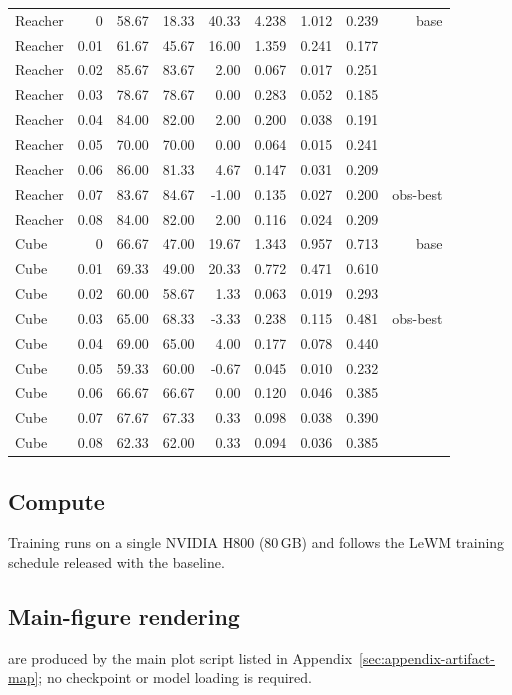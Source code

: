 \documentclass[10pt]{article}
\begin{document}
\begin{landscape}
\begin{table}[p]
\begin{tabular}{lrrrrrrrr}
\midrule
Reacher & 0 & 58.67 & 18.33 & 40.33 & 4.238 & 1.012 & 0.239 & base \\
Reacher & 0.01 & 61.67 & 45.67 & 16.00 & 1.359 & 0.241 & 0.177 &  \\
Reacher & 0.02 & 85.67 & 83.67 & 2.00 & 0.067 & 0.017 & 0.251 &  \\
Reacher & 0.03 & 78.67 & 78.67 & 0.00 & 0.283 & 0.052 & 0.185 &  \\
Reacher & 0.04 & 84.00 & 82.00 & 2.00 & 0.200 & 0.038 & 0.191 &  \\
Reacher & 0.05 & 70.00 & 70.00 & 0.00 & 0.064 & 0.015 & 0.241 &  \\
Reacher & 0.06 & 86.00 & 81.33 & 4.67 & 0.147 & 0.031 & 0.209 &  \\
Reacher & 0.07 & 83.67 & 84.67 & -1.00 & 0.135 & 0.027 & 0.200 & obs-best \\
Reacher & 0.08 & 84.00 & 82.00 & 2.00 & 0.116 & 0.024 & 0.209 &  \\
\midrule
Cube & 0 & 66.67 & 47.00 & 19.67 & 1.343 & 0.957 & 0.713 & base \\
Cube & 0.01 & 69.33 & 49.00 & 20.33 & 0.772 & 0.471 & 0.610 &  \\
Cube & 0.02 & 60.00 & 58.67 & 1.33 & 0.063 & 0.019 & 0.293 &  \\
Cube & 0.03 & 65.00 & 68.33 & -3.33 & 0.238 & 0.115 & 0.481 & obs-best \\
Cube & 0.04 & 69.00 & 65.00 & 4.00 & 0.177 & 0.078 & 0.440 &  \\
Cube & 0.05 & 59.33 & 60.00 & -0.67 & 0.045 & 0.010 & 0.232 &  \\
Cube & 0.06 & 66.67 & 66.67 & 0.00 & 0.120 & 0.046 & 0.385 &  \\
Cube & 0.07 & 67.67 & 67.33 & 0.33 & 0.098 & 0.038 & 0.390 &  \\
Cube & 0.08 & 62.33 & 62.00 & 0.33 & 0.094 & 0.036 & 0.385 &  \\
\bottomrule
\end{tabular}
\end{table}
\end{landscape}

\subsection{Compute}
Training runs on a single NVIDIA H800 (80\,GB) and follows the LeWM training schedule released with the baseline.

\subsection{Main-figure rendering}
 are produced by the main plot script listed in Appendix~\ref{sec:appendix-artifact-map}; no checkpoint or model loading is required.
\end{document}
